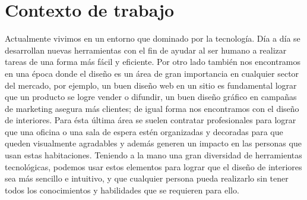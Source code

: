 \section{Contexto de trabajo}

Actualmente vivimos en un entorno que dominado por la tecnología. Día a día se desarrollan nuevas herramientas con el fin de ayudar al ser humano a realizar tareas de una forma más fácil y eficiente.
Por otro lado también nos encontramos en una época donde el diseño es un área de gran importancia en cualquier sector del mercado, por ejemplo, un buen diseño web en un sitio es fundamental lograr que un producto se logre vender o difundir, un buen diseño gráfico en campañas de marketing asegura más clientes; de igual forma nos encontramos con el diseño de interiores. Para ésta última área se suelen contratar profesionales para lograr que una oficina o una sala de espera estén organizadas y decoradas para que queden visualmente agradables y además  generen un impacto en las personas que usan estas habitaciones.
Teniendo a la mano una gran diversidad de herramientas tecnológicas, podemos usar estos elementos para lograr que el diseño de interiores sea más sencillo e intuitivo, y que cualquier persona pueda realizarlo sin tener todos los conocimientos y habilidades que se requieren para ello.